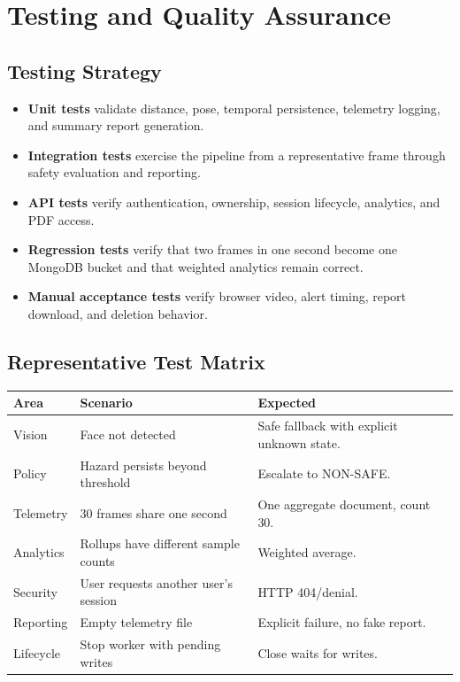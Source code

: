 \documentclass[12pt,a4paper]{report}
\begin{document}
\chapter{Testing and Quality Assurance}
\section{Testing Strategy}
\begin{itemize}
    \item \textbf{Unit tests} validate distance, pose, temporal persistence,
    telemetry logging, and summary report generation.
    \item \textbf{Integration tests} exercise the pipeline from a representative
    frame through safety evaluation and reporting.
    \item \textbf{API tests} verify authentication, ownership, session
    lifecycle, analytics, and PDF access.
    \item \textbf{Regression tests} verify that two frames in one second become
    one MongoDB bucket and that weighted analytics remain correct.
    \item \textbf{Manual acceptance tests} verify browser video, alert timing,
    report download, and deletion behavior.
\end{itemize}

\section{Representative Test Matrix}
\begin{longtable}{p{}p{}p{}}
\toprule
\textbf{Area} & \textbf{Scenario} & \textbf{Expected}\\
\midrule
Vision & Face not detected & Safe fallback with explicit unknown state.\\
Policy & Hazard persists beyond threshold & Escalate to NON-SAFE.\\
Telemetry & 30 frames share one second & One aggregate document, count 30.\\
Analytics & Rollups have different sample counts & Weighted average.\\
Security & User requests another user's session & HTTP 404/denial.\\
Reporting & Empty telemetry file & Explicit failure, no fake report.\\
Lifecycle & Stop worker with pending writes & Close waits for writes.\\
\bottomrule
\end{longtable}
\end{document}
